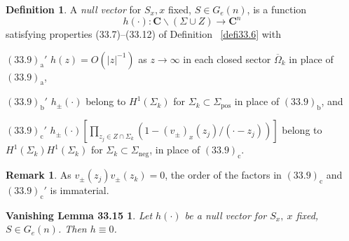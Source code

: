 \documentclass{surv-l}
\theoremstyle{plain}
\newtheorem*{vlem3315}{Vanishing Lemma 33.15}
\theoremstyle{definition}
\newtheorem{remark}[theorem]{Remark}
\newtheorem{definition}[theorem]{Definition}
\numberwithin{equation}{chapter}
\begin{document}
\setcounter{theorem}{12}
\begin{definition}\label{defi33.13}
A \emph{null vector} for $S_{x}, x$ fixed, $S\in G_{e}(n)$, is a function
\begin{equation*}
h(\cdot):\mathbf{C}\backslash (\Sigma\cup Z)\rightarrow \mathbf{C}^{n}
\end{equation*}
satisfying properties (33.7)--(33.12) of Definition ~\ref{defi33.6} with

$(33.9)_{\mathrm{a}}'$ $h(z)=O(|z|^{-1})$ as $ z\rightarrow\infty$ in each closed sector $\overline{\Omega}_{k}$ in place of $(33.9)_{\mathrm{a}}$,

$(33.9)_{\mathrm{b}}'$ $h_{\pm}(\cdot)$ belong to $H^{1}(\Sigma_{k})$ for $\Sigma_{k}\subset\Sigma_{\mathrm{pos}}$ in place of $(33.9)_{\mathrm{b}}$, and

$(33.9)_{\mathrm{c}}'$ $h_{\pm}(\cdot)[\prod_{z_{j}\in Z\cap\Sigma_{k}}(1-(v_{\pm})_{x}(z_{j})/(\cdot-z_{j}))]$ belong to $H^{1}(\Sigma_{k})H^{1}(\Sigma_{k})$ for $\Sigma_{k}\subset\Sigma_{\mathrm{neg}}$, in place of $(33.9)_{\mathrm{c}}$.
\end{definition}

\begin{remark}\label{rem33.14}
As $v_{\pm}(z_{j})v_{\pm}(z_{k})=0$, the order of the factors in $(33.9)_{\mathrm{c}}$ and $(33.9)_{\mathrm{c}}'$ is immaterial.
\end{remark}

\begin{vlem3315}\label{vlem33.15}
Let $h(\cdot)$ be a null vector for $S_{x},\ x$ fixed, $ S\in G_{e}(n)$. Then $h\equiv 0$.
\end{vlem3315} 
\end{document}
